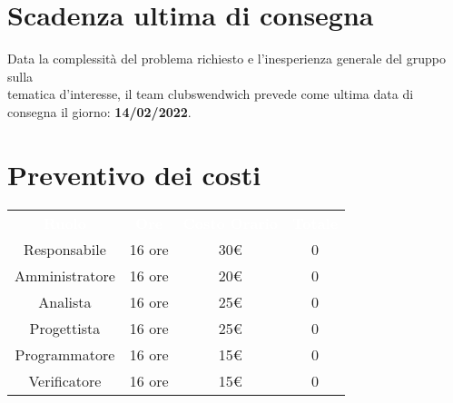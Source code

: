\section{Scadenza ultima di consegna}
Data la complessità del problema richiesto e l'inesperienza generale del gruppo sulla \\
tematica d'interesse, il team clubswendwich prevede come ultima data di consegna 
il giorno: \textbf{14/02/2022}.



\section{Preventivo dei costi}

{\renewcommand{\arraystretch}{1.5}
\begin{tabular}{cccc}
	\rowcolor[RGB]{33, 73, 50}
	\textcolor{white}{\textbf{Ruolo}} & \textcolor{white}{\textbf{Ore}} 
    & \textcolor{white}{\textbf{Costo Orario}} & \textcolor{white}{\textbf{Totale}}\\
	\rowcolor[RGB]{216, 235, 171}
	Responsabile & 16 ore & 30€ & 0      \\
	\rowcolor[RGB]{233, 245, 206}
	Amministratore & 16 ore & 20€ & 0    \\
    \rowcolor[RGB]{216, 235, 171}
	Analista & 16 ore & 25€ & 0          \\
	\rowcolor[RGB]{233, 245, 206}
	Progettista & 16 ore & 25€ & 0       \\
    \rowcolor[RGB]{216, 235, 171}
	Programmatore & 16 ore & 15€ & 0     \\
	\rowcolor[RGB]{233, 245, 206}
	Verificatore & 16 ore & 15€ & 0      \\
\end{tabular}	
}

